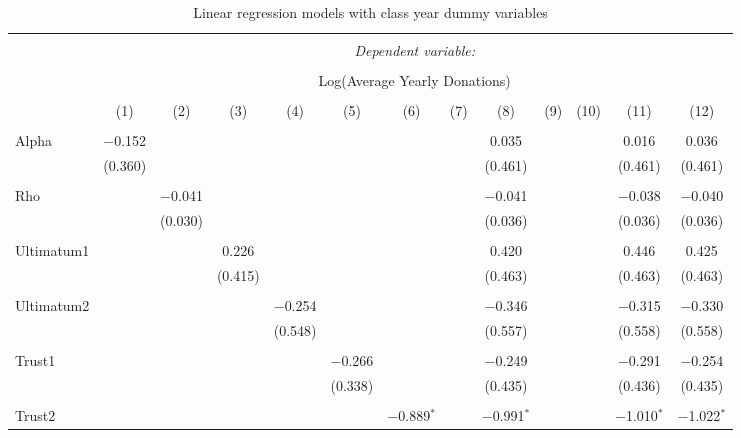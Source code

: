\begin{subtables}
\begin{table}[H] \centering 
  \caption{Linear regression models with class year dummy variables} 
  \label{} 
   \begin{adjustbox}{width=\textwidth}
\begin{tabular}{@{\extracolsep{5pt}}lcccccccccccc} 
\\[-1.8ex]\hline 
\hline \\[-1.8ex] 
 & \multicolumn{12}{c}{\textit{Dependent variable:}} \\ 
\cline{2-13} 
\\[-1.8ex] & \multicolumn{12}{c}{Log(Average Yearly Donations)} \\ 
\\[-1.8ex] & (1) & (2) & (3) & (4) & (5) & (6) & (7) & (8) & (9) & (10) & (11) & (12)\\ 
\hline \\[-1.8ex] 
 Alpha & $-$0.152 &  &  &  &  &  &  & 0.035 &  &  & 0.016 & 0.036 \\ 
  & (0.360) &  &  &  &  &  &  & (0.461) &  &  & (0.461) & (0.461) \\ 
  & & & & & & & & & & & & \\ 
 Rho &  & $-$0.041 &  &  &  &  &  & $-$0.041 &  &  & $-$0.038 & $-$0.040 \\ 
  &  & (0.030) &  &  &  &  &  & (0.036) &  &  & (0.036) & (0.036) \\ 
  & & & & & & & & & & & & \\ 
 Ultimatum1 &  &  & 0.226 &  &  &  &  & 0.420 &  &  & 0.446 & 0.425 \\ 
  &  &  & (0.415) &  &  &  &  & (0.463) &  &  & (0.463) & (0.463) \\ 
  & & & & & & & & & & & & \\ 
 Ultimatum2 &  &  &  & $-$0.254 &  &  &  & $-$0.346 &  &  & $-$0.315 & $-$0.330 \\ 
  &  &  &  & (0.548) &  &  &  & (0.557) &  &  & (0.558) & (0.558) \\ 
  & & & & & & & & & & & & \\ 
 Trust1 &  &  &  &  & $-$0.266 &  &  & $-$0.249 &  &  & $-$0.291 & $-$0.254 \\ 
  &  &  &  &  & (0.338) &  &  & (0.435) &  &  & (0.436) & (0.435) \\ 
  & & & & & & & & & & & & \\ 
 Trust2 &  &  &  &  &  & $-$0.889$^{*}$ &  & $-$0.991$^{*}$ &  &  & $-$1.010$^{*}$ & $-$1.022$^{*}$ \\ 

\end{tabular}
\end{adjustbox}
\end{table}
\end{subtables}

